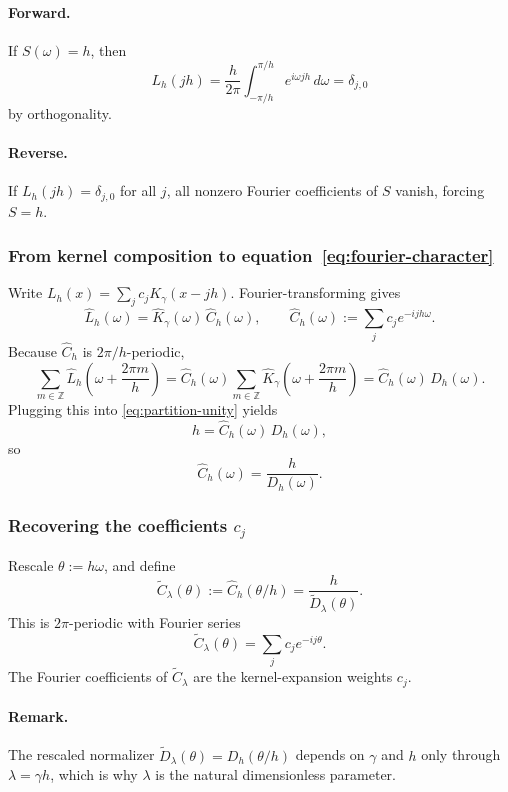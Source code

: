 \documentclass{article}
\begin{document}
\paragraph{Forward.}
If \(S(\omega) = h\), then
\[
L_h(jh)
=
\frac{h}{2\pi}\int_{-\pi/h}^{\pi/h} e^{i\omega jh}\, d\omega
=
\delta_{j,0}
\]
by orthogonality.

\paragraph{Reverse.}
If \(L_h(jh) = \delta_{j,0}\) for all \(j\), all nonzero Fourier coefficients of \(S\) vanish, forcing \(S = h\).

\subsubsection{From kernel composition to equation~\eqref{eq:fourier-character}}

Write \(L_h(x) = \sum_j c_j K_\gamma(x - jh)\). Fourier-transforming gives
\[
\widehat{L}_h(\omega) = \widehat{K}_\gamma(\omega)\,\widehat{C}_h(\omega),
\qquad
\widehat{C}_h(\omega) := \sum_j c_j e^{-ijh\omega}.
\]
Because \(\widehat{C}_h\) is \(2\pi/h\)-periodic,
\[
\sum_{m \in \mathbb{Z}} \widehat{L}_h\!\left(\omega+\frac{2\pi m}{h}\right)
=
\widehat{C}_h(\omega)\sum_{m \in \mathbb{Z}} \widehat{K}_\gamma\!\left(\omega+\frac{2\pi m}{h}\right)
=
\widehat{C}_h(\omega)\,D_h(\omega).
\]
Plugging this into \eqref{eq:partition-unity} yields
\[
h = \widehat{C}_h(\omega)\,D_h(\omega),
\]
so
\[
\widehat{C}_h(\omega) = \frac{h}{D_h(\omega)}.
\]

\subsubsection{Recovering the coefficients \(c_j\)}

Rescale \(\theta := h\omega\), and define
\[
\widetilde{C}_\lambda(\theta)
:=
\widehat{C}_h(\theta/h)
=
\frac{h}{\widetilde{D}_\lambda(\theta)}.
\]
This is \(2\pi\)-periodic with Fourier series
\[
\widetilde{C}_\lambda(\theta) = \sum_j c_j e^{-ij\theta}.
\]
The Fourier coefficients of \(\widetilde{C}_\lambda\) are the kernel-expansion weights \(c_j\).

\paragraph{Remark.}
The rescaled normalizer \(\widetilde{D}_\lambda(\theta) = D_h(\theta/h)\) depends on \(\gamma\) and \(h\) only through \(\lambda = \gamma h\), which is why \(\lambda\) is the natural dimensionless parameter.
\end{document}
